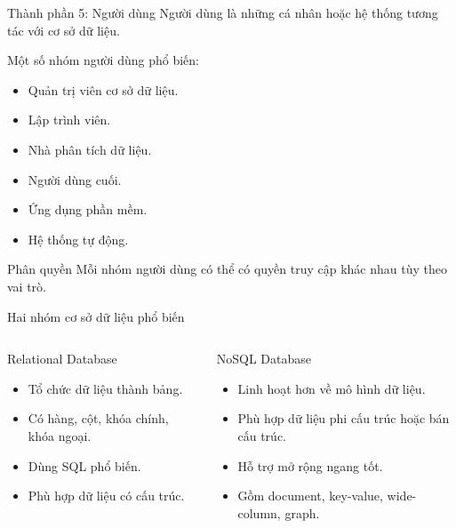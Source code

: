 ﻿\documentclass[aspectratio=169,11pt]{beamer}
\newcommand{\tightlist}{\setlength{\itemsep}{2pt}\setlength{\parskip}{0pt}}
\begin{document}
\begin{frame}{Thành phần 5: Người dùng}
\small
Người dùng là những cá nhân hoặc hệ thống tương tác với cơ sở dữ liệu.

\vspace{0.15cm}
Một số nhóm người dùng phổ biến:
\begin{itemize}
\tightlist
  \item Quản trị viên cơ sở dữ liệu.
  \item Lập trình viên.
  \item Nhà phân tích dữ liệu.
  \item Người dùng cuối.
  \item Ứng dụng phần mềm.
  \item Hệ thống tự động.
\end{itemize}

\begin{block}{Phân quyền}
Mỗi nhóm người dùng có thể có quyền truy cập khác nhau tùy theo vai trò.
\end{block}
\end{frame}

\begin{frame}{Hai nhóm cơ sở dữ liệu phổ biến}
\small
\begin{columns}[T]
\begin{block}{Relational Database}
\begin{itemize}
\tightlist
  \item Tổ chức dữ liệu thành bảng.
  \item Có hàng, cột, khóa chính, khóa ngoại.
  \item Dùng SQL phổ biến.
  \item Phù hợp dữ liệu có cấu trúc.
\end{itemize}
\end{block}

\begin{block}{NoSQL Database}
\begin{itemize}
\tightlist
  \item Linh hoạt hơn về mô hình dữ liệu.
  \item Phù hợp dữ liệu phi cấu trúc hoặc bán cấu trúc.
  \item Hỗ trợ mở rộng ngang tốt.
  \item Gồm document, key-value, wide-column, graph.
\end{itemize}
\end{block}
\end{columns}
\end{frame}
\end{document}
